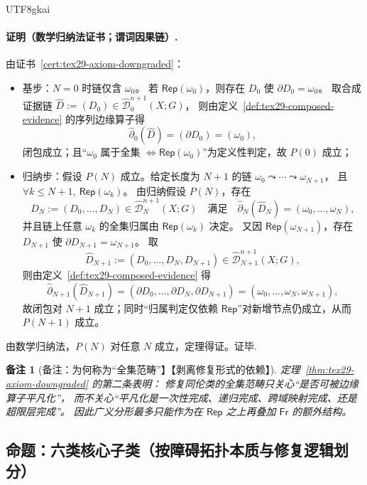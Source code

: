 \documentclass[12pt]{article}
\newtheorem{remark}{备注}[section]
\begin{document}
\begin{CJK*}{UTF8}{gkai}
\paragraph{证明（数学归纳法证书；谓词因果链）.}
由证书~\ref{cert:tex29-axiom-downgraded}：
\begin{itemize}
  \item 基步：$N=0$ 时链仅含 $\omega_0$。
  若 $\mathsf{Rep}(\omega_0)$，则存在 $D_0$ 使 $\partial D_0=\omega_0$。
  取合成证据链 $\widehat{D}:=(D_0)\in\widehat{\mathcal{D}}^{n+1}_0(X;G)$，
  则由定义~\ref{def:tex29-composed-evidence} 的序列边缘算子得
  \[
    \widehat{\partial}_0(\widehat{D})=(\partial D_0)=(\omega_0),
  \]
  闭包成立；且“$\omega_0$ 属于全集 $\Leftrightarrow \mathsf{Rep}(\omega_0)$”为定义性判定，故 $P(0)$ 成立；
  \item 归纳步：假设 $P(N)$ 成立。给定长度为 $N+1$ 的链 $\omega_0\leadsto\cdots\leadsto\omega_{N+1}$，
  且 $\forall k\le N+1,\ \mathsf{Rep}(\omega_k)$。
  由归纳假设 $P(N)$，存在
  \[
    \widehat{D}_N:=(D_0,\dots,D_N)\in\widehat{\mathcal{D}}^{n+1}_N(X;G)
    \quad\text{满足}\quad
    \widehat{\partial}_N(\widehat{D}_N)=(\omega_0,\dots,\omega_N),
  \]
  并且链上任意 $\omega_k$ 的全集归属由 $\mathsf{Rep}(\omega_k)$ 决定。
  又因 $\mathsf{Rep}(\omega_{N+1})$，存在 $D_{N+1}$ 使 $\partial D_{N+1}=\omega_{N+1}$。
  取
  \[
    \widehat{D}_{N+1}:=(D_0,\dots,D_N,D_{N+1})\in\widehat{\mathcal{D}}^{n+1}_{N+1}(X;G),
  \]
  则由定义~\ref{def:tex29-composed-evidence} 得
  \[
    \widehat{\partial}_{N+1}(\widehat{D}_{N+1})=(\partial D_0,\dots,\partial D_N,\partial D_{N+1})
    =(\omega_0,\dots,\omega_N,\omega_{N+1}),
  \]
  故闭包对 $N+1$ 成立；同时“归属判定仅依赖 $\mathsf{Rep}$”对新增节点仍成立，从而 $P(N+1)$ 成立。
\end{itemize}
由数学归纳法，$P(N)$ 对任意 $N$ 成立，定理得证。证毕.

\begin{remark}[备注：为何称为“全集范畴”】【剥离修复形式的依赖】]
定理~\ref{thm:tex29-axiom-downgraded} 的第二条表明：
修复同伦类的全集范畴只关心“是否可被边缘算子平凡化”，
而不关心“平凡化是一次性完成、递归完成、跨域映射完成、还是超限层完成”。
因此广义分形最多只能作为在 $\mathsf{Rep}$ 之上再叠加 $\mathsf{Fr}$ 的\emph{额外结构}。
\end{remark}

\subsection{命题：六类核心子类（按障碍拓扑本质与修复逻辑划分）}
\label{subsec:tex29-six-classes}


\end{CJK*}
\end{document}
